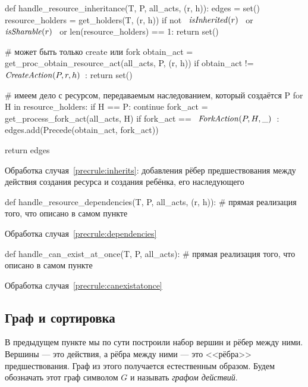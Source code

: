 \begin{listing}[ht!]
\begin{pythoncode}
def handle_resource_inheritance(T, P, all_acts, (r, h)):
    edges = set()
    resource_holders = get_holders(T, (r, h))
    if not ~$\isinherited{r}$~ or ~$\issharable{r}$~ or len(resource_holders) == 1:
        return set()

    # может быть только create или fork
    obtain_act = get_proc_obtain_resource_act(all_acts, P, (r, h))
    if obtain_act != ~$\crcreate{P}{r}{h}$~:
        return set()

    # имеем дело с ресурсом, передаваемым наследованием, который создаётся P
    for H in resource_holders:
        if H == P:
            continue
        fork_act = get_process_fork_act(all_acts, H)
        if fork_act == ~$\crfork{P}{H}{\_}$~:
            edges.add(Precede(obtain_act, fork_act))

    return edges
\end{pythoncode}
\caption{Обработка случая~\ref{precrule:inherits}: добавления рёбер предшествования между действия создания ресурса и создания ребёнка, его наследующего}
\end{listing}

\begin{listing}[ht!]
\begin{pythoncode}
def handle_resource_dependencies(T, P, all_acts, (r, h)):
    # прямая реализация того, что описано в самом пункте
\end{pythoncode}
\caption{Обработка случая~\ref{precrule:dependencies}}
\end{listing}

\begin{listing}[ht!]
\begin{pythoncode}
def handle_can_exist_at_once(T, P, all_acts):
    # прямая реализация того, что описано в самом пункте
\end{pythoncode}
\caption{Обработка случая~\ref{precrule:canexistatonce}}
\end{listing}

\subsection{Граф и сортировка}

В предыдущем пункте мы по сути построили набор вершин и рёбер между ними. Вершины --- это действия, а рёбра между ними --- это <<рёбра>> предшествования. Граф из этого получается естественным образом. Будем обозначать этот граф символом $G$ и называть \emph{графом действий}.

